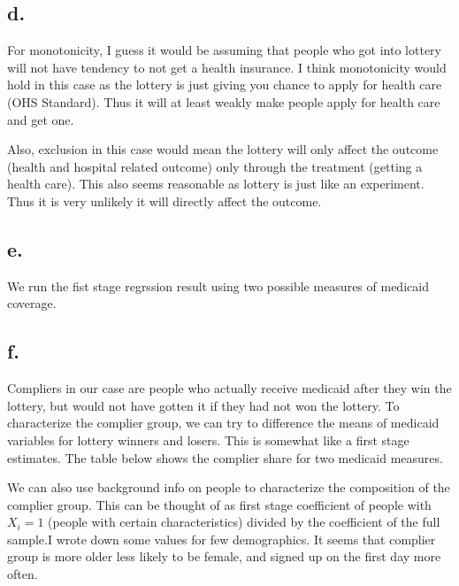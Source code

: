 \documentclass[
  letterpaper,
  DIV=11,
  numbers=noendperiod]{scrartcl}
\begin{document}
\subsection{d.}\label{d.-1}

For monotonicity, I guess it would be assuming that people who got into
lottery will not have tendency to not get a health insurance. I think
monotonicity would hold in this case as the lottery is just giving you
chance to apply for health care (OHS Standard). Thus it will at least
weakly make people apply for health care and get one.

Also, exclusion in this case would mean the lottery will only affect the
outcome (health and hospital related outcome) only through the treatment
(getting a health care). This also seems reasonable as lottery is just
like an experiment. Thus it is very unlikely it will directly affect the
outcome.

\subsection{e.}\label{e.-1}

We run the fist stage regrssion result using two possible measures of
medicaid coverage.

\begin{table}[!h]
\end{table}

\subsection{f.}\label{f.}

Compliers in our case are people who actually receive medicaid after
they win the lottery, but would not have gotten it if they had not won
the lottery. To characterize the complier group, we can try to
difference the means of medicaid variables for lottery winners and
losers. This is somewhat like a first stage estimates. The table below
shows the complier share for two medicaid measures.

We can also use background info on people to characterize the
composition of the complier group. This can be thought of as first stage
coefficient of people with \(X_i=1\) (people with certain
characteristics) divided by the coefficient of the full sample.I wrote
down some values for few demographics. It seems that complier group is
more older less likely to be female, and signed up on the first day more
often.
\end{document}

